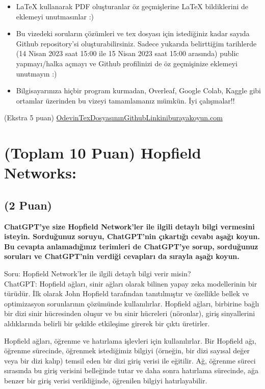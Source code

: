 \documentclass[11pt]{article}
\begin{document}
\begin{itemize}
    \item LaTeX kullanarak PDF oluşturanlar öz geçmişlerine LaTeX bildiklerini de eklemeyi unutmasınlar :)
    \item Bu vizedeki soruların çözümleri ve tex dosyası için istediğiniz kadar sayıda Github repository'si oluşturabilirsiniz. Sadece yukarıda belirttiğim tarihlerde (14 Nisan 2023 saat 15:00 ile 15 Nisan 2023 saat 15:00 arasında) public yapmayı/halka açmayı ve Github profilinizi de öz geçmişinize eklemeyi unutmayın :)
    \item Bilgisayarınıza hiçbir program kurmadan, Overleaf, Google Colab, Kaggle gibi ortamlar üzerinden bu vizeyi tamamlamanız mümkün. İyi çalışmalar!!
\end{itemize}

(Ekstra 5 puan) \url{OdevinTexDosyasınınGithubLinkiniburayakoyun.com}

\newpage
\section{(Toplam 10 Puan) Hopfield Networks:}

\subsection{(2 Puan)} \textbf{ChatGPT’ye size Hopfield Network’ler ile ilgili detaylı bilgi vermesini isteyin. Sorduğunuz soruyu, ChatGPT'nin çıkartığı cevabı aşağı koyun. Bu cevapta anlamadığınız terimleri de ChatGPT’ye sorup, sorduğunuz soruları ve ChatGPT’nin verdiği cevapları da sırayla aşağı koyun.}

Soru: Hopfield Network’ler ile ilgili detaylı bilgi verir misin?\\

ChatGPT: Hopfield ağları, sinir ağları olarak bilinen yapay zeka modellerinin bir türüdür. İlk olarak John Hopfield tarafından tanıtılmıştır ve özellikle bellek ve optimizasyon sorunlarının çözümünde kullanılırlar. Hopfield ağları, birbirine bağlı bir dizi sinir hücresinden oluşur ve bu sinir hücreleri (nöronlar), giriş sinyallerini aldıklarında belirli bir şekilde etkileşime girerek bir çıktı üretirler.

Hopfield ağları, öğrenme ve hatırlama işlevleri için kullanılırlar. Bir Hopfield ağı, öğrenme sürecinde, öğrenmek istediğimiz bilgiyi (örneğin, bir dizi sayısal değer veya bir dizi kalıp) temsil eden bir dizi giriş verisi ile eğitilir. Ağ, öğrenme süreci sırasında bu giriş verisini belleğinde tutar ve daha sonra hatırlama sürecinde, ağa benzer bir giriş verisi verildiğinde, öğrenilen bilgiyi hatırlayabilir.
\end{document}

